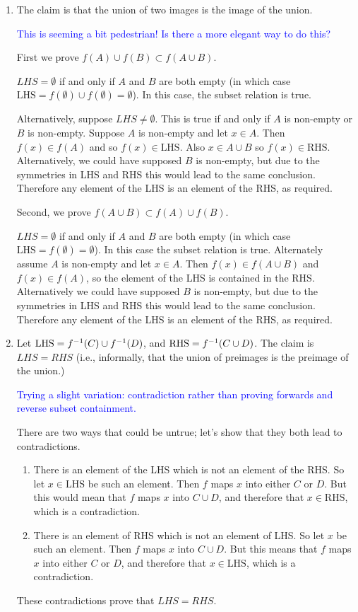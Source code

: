 \documentclass[12pt]{article}
\newcommand{\LHS}{\text{LHS}}
\newcommand{\RHS}{\text{RHS}}
\begin{document}
\begin{mdframed}
  \begin{enumerate}[label=(\roman*)]
  \item The claim is that the union of two images is the image of the
    union.

    \textcolor{blue}{This is seeming a bit pedestrian! Is there a more elegant way to do this?}

    First we prove $f(A) \cup f(B) \subset f(A \cup B)$.

    $LHS = \emptyset$ if and only if $A$ and $B$ are both empty (in which case
    $\LHS = f(\emptyset) \cup f(\emptyset) = \emptyset$). In this case, the
    subset relation is true.

    Alternatively, suppose $LHS \neq \emptyset$. This is true if and only if
    $A$ is non-empty or $B$ is non-empty. Suppose $A$ is non-empty and let
    $x \in A$. Then $f(x) \in f(A)$ and so $f(x) \in \LHS$. Also
    $x \in A \cup B$ so $f(x) \in \RHS$. Alternatively, we could have supposed
    $B$ is non-empty, but due to the symmetries in LHS and RHS this would lead
    to the same conclusion. Therefore any element of the LHS is an element of
    the RHS, as required.

    Second, we prove $f(A \cup B) \subset f(A) \cup f(B)$.

    $LHS = \emptyset$ if and only if $A$ and $B$ are both empty (in which case
    $\LHS = f(\emptyset) = \emptyset$). In this case the subset relation is
    true. Alternately assume $A$ is non-empty and let $x \in A$. Then
    $f(x) \in f(A \cup B)$ and $f(x) \in f(A)$, so the element of the LHS is
    contained in the RHS. Alternatively we could have supposed $B$ is
    non-empty, but due to the symmetries in LHS and RHS this would lead to the
    same conclusion. Therefore any element of the LHS is an element of the RHS,
    as required.

  \item Let $\LHS = f^\1(C) \cup f^\1(D)$, and $\RHS = f^\1(C \cup D)$. The
    claim is $LHS=RHS$ (i.e., informally, that the union of preimages is the
    preimage of the union.)

    \textcolor{blue}{Trying a slight variation: contradiction rather than
      proving forwards and reverse subset containment.}

    There are two ways that could be untrue; let's show that they both lead to
    contradictions.
    \begin{enumerate}
    \item There is an element of the LHS which is not an element of the RHS. So
      let $x \in \LHS$ be such an element. Then $f$ maps $x$ into either $C$ or
      $D$. But this would mean that $f$ maps $x$ into $C\cup D$, and therefore
      that $x \in \RHS$, which is a contradiction.
    \item There is an element of RHS which is not an element of LHS. So let $x$
      be such an element. Then $f$ maps $x$ into $C \cup D$. But this means
      that $f$ maps $x$ into either $C$ or $D$, and therefore that
      $x \in \LHS$, which is a contradiction.
    \end{enumerate}
    These contradictions prove that $LHS=RHS$.


\end{enumerate}
\end{mdframed}
\end{document}
